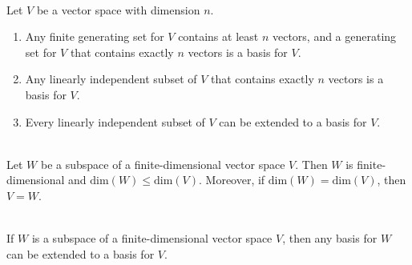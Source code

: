 \begin{corollary}
	\hfill\\
	Let $V$ be a vector space with dimension $n$.
	\begin{enumerate}
		\item Any finite generating set for $V$ contains at least $n$ vectors, and a generating set for $V$ that contains exactly $n$ vectors is a basis for $V$.
		
		\item Any linearly independent subset of $V$ that contains exactly $n$ vectors is a basis for $V$.
		
		\item Every linearly independent subset of $V$ can be extended to a basis for $V$.
	\end{enumerate}
\end{corollary}

\begin{theorem}
	\hfill\\
	Let $W$ be a subspace of a finite-dimensional vector space $V$. Then $W$ is finite-dimensional and $\text{dim}(W) \leq \text{dim}(V)$. Moreover, if $\text{dim}(W) = \text{dim}(V)$, then $V = W$.
\end{theorem}

\begin{corollary}
	\hfill\\
	If $W$ is a subspace of a finite-dimensional vector space $V$, then any basis for $W$ can be extended to a basis for $V$.
\end{corollary}


